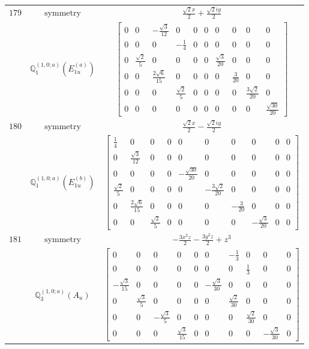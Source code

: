 \documentclass[fleqn,8pt,landscape]{jsarticle}
\begin{document}
\begin{longtable}{ccc}
$ 179 $ & $ \text{symmetry} $ & $ \frac{\sqrt{2} x}{2} + \frac{\sqrt{2} i y}{2} $ \\
$  $ & $ \mathbb{Q}_{1}^{(1,0;a)}(E_{1u}^{(a)}) $ & $ \begin{bmatrix} 0 & 0 & - \frac{\sqrt{3}}{12} & 0 & 0 & 0 & 0 & 0 & 0 & 0 \\ 0 & 0 & 0 & - \frac{1}{4} & 0 & 0 & 0 & 0 & 0 & 0 \\ 0 & \frac{\sqrt{2}}{5} & 0 & 0 & 0 & 0 & \frac{\sqrt{3}}{20} & 0 & 0 & 0 \\ 0 & 0 & \frac{2 \sqrt{6}}{15} & 0 & 0 & 0 & 0 & \frac{3}{20} & 0 & 0 \\ 0 & 0 & 0 & \frac{\sqrt{2}}{5} & 0 & 0 & 0 & 0 & \frac{3 \sqrt{2}}{20} & 0 \\ 0 & 0 & 0 & 0 & 0 & 0 & 0 & 0 & 0 & \frac{\sqrt{30}}{20} \end{bmatrix} $ \\ \hline
$ 180 $ & $ \text{symmetry} $ & $ \frac{\sqrt{2} x}{2} - \frac{\sqrt{2} i y}{2} $ \\
$  $ & $ \mathbb{Q}_{1}^{(1,0;a)}(E_{1u}^{(b)}) $ & $ \begin{bmatrix} \frac{1}{4} & 0 & 0 & 0 & 0 & 0 & 0 & 0 & 0 & 0 \\ 0 & \frac{\sqrt{3}}{12} & 0 & 0 & 0 & 0 & 0 & 0 & 0 & 0 \\ 0 & 0 & 0 & 0 & - \frac{\sqrt{30}}{20} & 0 & 0 & 0 & 0 & 0 \\ \frac{\sqrt{2}}{5} & 0 & 0 & 0 & 0 & - \frac{3 \sqrt{2}}{20} & 0 & 0 & 0 & 0 \\ 0 & \frac{2 \sqrt{6}}{15} & 0 & 0 & 0 & 0 & - \frac{3}{20} & 0 & 0 & 0 \\ 0 & 0 & \frac{\sqrt{2}}{5} & 0 & 0 & 0 & 0 & - \frac{\sqrt{3}}{20} & 0 & 0 \end{bmatrix} $ \\ \hline
$ 181 $ & $ \text{symmetry} $ & $ - \frac{3 x^{2} z}{2} - \frac{3 y^{2} z}{2} + z^{3} $ \\
$  $ & $ \mathbb{Q}_{3}^{(1,0;a)}(A_{u}) $ & $ \begin{bmatrix} 0 & 0 & 0 & 0 & 0 & 0 & - \frac{1}{3} & 0 & 0 & 0 \\ 0 & 0 & 0 & 0 & 0 & 0 & 0 & \frac{1}{3} & 0 & 0 \\ - \frac{\sqrt{3}}{15} & 0 & 0 & 0 & 0 & - \frac{\sqrt{3}}{30} & 0 & 0 & 0 & 0 \\ 0 & \frac{\sqrt{3}}{5} & 0 & 0 & 0 & 0 & \frac{\sqrt{2}}{30} & 0 & 0 & 0 \\ 0 & 0 & - \frac{\sqrt{3}}{5} & 0 & 0 & 0 & 0 & \frac{\sqrt{2}}{30} & 0 & 0 \\ 0 & 0 & 0 & \frac{\sqrt{3}}{15} & 0 & 0 & 0 & 0 & - \frac{\sqrt{3}}{30} & 0 \end{bmatrix} $ \\ \hline

\end{longtable}
\end{document}
